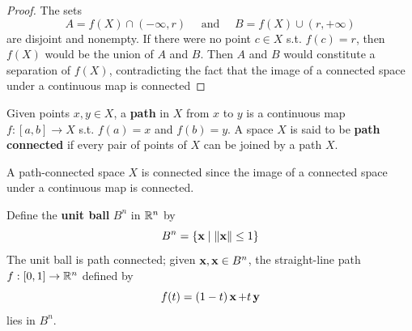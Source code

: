 \documentclass[11pt]{article}
\begin{document}
\begin{proof}
The sets
\begin{equation*}
A=f(X)\cap(-\infty,r) \quad\text{ and }\quad B=f(X)\cup(r,+\infty)
\end{equation*}
are disjoint and nonempty. If there were no point \(c\in X\) s.t. \(f(c)=r\), then \(f(X)\) would
be the union of \(A\) and \(B\). Then \(A\) and \(B\) would constitute a separation of \(f(X)\),
contradicting the fact that the image of a connected space under a continuous map is connected
\end{proof}


\begin{definition}[]
Given points \(x,y\in X\), a \textbf{path} in \(X\) from \(x\) to \(y\) is a continuous map \(f:[a,b]\to X\)
s.t. \(f(a)=x\) and  \(f(b)=y\). A space \(X\) is said to be \textbf{path connected} if every pair of
points of \(X\) can be joined by a path \(X\).
\end{definition}

A path-connected space \(X\) is connected since the image of a connected space under a continuous
map is connected.

\begin{examplle}[]
Define the \textbf{unit ball} \(B^n\) in \(\mathbb{R}^n\) by
\begin{equation*}
B^n=\{\operatorname{\textbf{x}}\mid\left\lVert\operatorname{\textbf{x}}\right\rVert\le 1\}
\end{equation*}
The unit ball is path connected; given \(\operatorname{\textbf{x}},\operatorname{\textbf{x}}\in B^n\), the straight-line path
\(f:[0,1]\to\mathbb{R}^n\) defined by
\begin{equation*}
f(t)=(1-t)\operatorname{\textbf{x}}+t\operatorname{\textbf{y}}
\end{equation*}
lies in \(B^n\).
\end{examplle}
\end{document}
